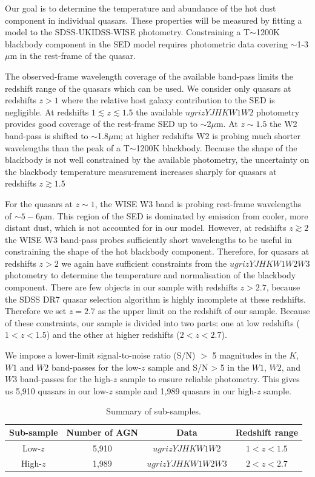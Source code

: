 Our goal is to determine the temperature and abundance of the hot dust component in individual quasars.  
These properties will be measured by fitting a model to the SDSS-UKIDSS-WISE photometry. 
Constraining a T$\sim$1200K blackbody component in the SED model requires photometric data covering $\sim$1-3$\mu$m in the rest-frame of the quasar. 

The observed-frame wavelength coverage of the available band-pass limits the redshift range of the quasars which can be used. 
We consider only quasars at redshifts $z>1$ where the relative host galaxy contribution to the SED is negligible. 
At redshifts $1 \lesssim z \lesssim 1.5$ the available $ugrizYJHKW1W2$ photometry provides good coverage of the rest-frame SED up to $\sim$2$\mu$m.
At $z\sim1.5$ the W2 band-pass is shifted to $\sim$1.8$\mu$m; at higher redshifts W2 is probing much shorter wavelengths than the peak of a T$\sim$1200K blackbody. 
Because the shape of the blackbody is not well constrained by the available photometry, the uncertainty on the blackbody temperature measurement increases sharply for quasars at redshifts $z\gtrsim1.5$ 

For the quasars at $z \sim 1$, the WISE W3 band is probing rest-frame wavelengths of $\sim5-6\mu$m. 
This region of the SED is dominated by emission from cooler, more distant dust, which is not accounted for in our model.
However, at redshifts $z \gtrsim 2$ the WISE W3 band-pass probes sufficiently short wavelengths to be useful in constraining the shape of the hot blackbody component. 
Therefore, for quasars at redshifts $z > 2$ we again have sufficient constraints from the $ugrizYJHKW1W2W3$ photometry to determine the temperature and normalisation of the blackbody component. 
There are few objects in our sample with redshifts $z > 2.7$, because the SDSS DR7 quasar selection algorithm is highly incomplete at these redshifts.  
Therefore we set $z=2.7$ as the upper limit on the redshift of our sample. 
Because of these constraints, our sample is divided into two parts: one at low redshifts ($1 < z < 1.5$) and the other at higher redshifts ($2 < z < 2.7$). 

We impose a lower-limit signal-to-noise ratio (S/N) $>$ 5 magnitudes in the $K$, $W1$ and $W2$ band-passes for the low-$z$ sample and S/N > 5 in the $W1$, $W2$, and $W3$ band-passes for the high-$z$ sample to ensure reliable photometry.
This gives us 5,910 quasars in our low-$z$ sample and 1,989 quasars in our high-$z$ sample. 

\begin{table}
  \small
  \centering
  \begin{tabular}{cccc}
    \hline 
    Sub-sample & Number of AGN & Data & Redshift range \\
    \hline 
    Low-$z$ & 5,910 & $ugrizYJHKW1W2$ & $1 < z < 1.5$ \\
    High-$z$ & 1,989 & $ugrizYJHKW1W2W3$ & $2 < z < 2.7$ \\           
    \hline
  \end{tabular}
  \caption{Summary of sub-samples.}
  \label{tab:sub-samples}
\end{table}


